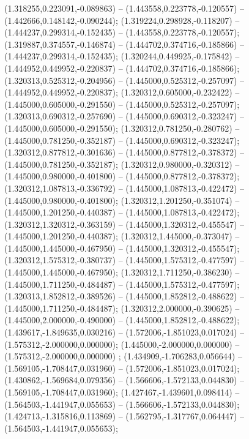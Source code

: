  (1.318255,0.223091,-0.089863) -- (1.443558,0.223778,-0.120557) -- (1.442666,0.148142,-0.090244);
 (1.319224,0.298928,-0.118207) -- (1.444237,0.299314,-0.152435) -- (1.443558,0.223778,-0.120557);
 (1.319887,0.374557,-0.146874) -- (1.444702,0.374716,-0.185866) -- (1.444237,0.299314,-0.152435);
 (1.320244,0.449925,-0.175842) -- (1.444952,0.449952,-0.220837) -- (1.444702,0.374716,-0.185866);
 (1.320313,0.525312,-0.204956) -- (1.445000,0.525312,-0.257097) -- (1.444952,0.449952,-0.220837);
 (1.320312,0.605000,-0.232422) -- (1.445000,0.605000,-0.291550) -- (1.445000,0.525312,-0.257097);
 (1.320313,0.690312,-0.257690) -- (1.445000,0.690312,-0.323247) -- (1.445000,0.605000,-0.291550);
 (1.320312,0.781250,-0.280762) -- (1.445000,0.781250,-0.352187) -- (1.445000,0.690312,-0.323247);
 (1.320312,0.877812,-0.301636) -- (1.445000,0.877812,-0.378372) -- (1.445000,0.781250,-0.352187);
 (1.320312,0.980000,-0.320312) -- (1.445000,0.980000,-0.401800) -- (1.445000,0.877812,-0.378372);
 (1.320312,1.087813,-0.336792) -- (1.445000,1.087813,-0.422472) -- (1.445000,0.980000,-0.401800);
 (1.320312,1.201250,-0.351074) -- (1.445000,1.201250,-0.440387) -- (1.445000,1.087813,-0.422472);
 (1.320312,1.320312,-0.363159) -- (1.445000,1.320312,-0.455547) -- (1.445000,1.201250,-0.440387);
 (1.320312,1.445000,-0.373047) -- (1.445000,1.445000,-0.467950) -- (1.445000,1.320312,-0.455547);
 (1.320312,1.575312,-0.380737) -- (1.445000,1.575312,-0.477597) -- (1.445000,1.445000,-0.467950);
 (1.320312,1.711250,-0.386230) -- (1.445000,1.711250,-0.484487) -- (1.445000,1.575312,-0.477597);
 (1.320313,1.852812,-0.389526) -- (1.445000,1.852812,-0.488622) -- (1.445000,1.711250,-0.484487);
 (1.320312,2.000000,-0.390625) -- (1.445000,2.000000,-0.490000) -- (1.445000,1.852812,-0.488622);
 (1.439617,-1.849635,0.030216) -- (1.572006,-1.851023,0.017024) -- (1.575312,-2.000000,0.000000);
 (1.445000,-2.000000,0.000000) -- (1.575312,-2.000000,0.000000) ;
 (1.434909,-1.706283,0.056644) -- (1.569105,-1.708447,0.031960) -- (1.572006,-1.851023,0.017024);
 (1.430862,-1.569684,0.079356) -- (1.566606,-1.572133,0.044830) -- (1.569105,-1.708447,0.031960);
 (1.427467,-1.439601,0.098414) -- (1.564503,-1.441947,0.055653) -- (1.566606,-1.572133,0.044830);
 (1.424713,-1.315816,0.113869) -- (1.562795,-1.317767,0.064447) -- (1.564503,-1.441947,0.055653);
